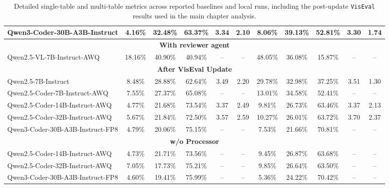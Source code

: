 \documentclass[a4paper,oneside,bibliography=totoc]{scrbook}
\begin{document}
\begin{table}[h!]
{\begin{tabular}{l|ccccc|ccccc}
Qwen3-Coder-30B-A3B-Instruct  & 4.16\% & 32.48\% & 63.37\% & 3.34 & 2.10 & 8.06\% & 39.13\% & 52.81\% & 3.30 & 1.74 \\

\midrule
\multicolumn{11}{c}{\textbf{With reviewer agent}} \\
\midrule
Qwen2.5-VL-7B-Instruct-AWQ  & 18.16\% & 40.90\% & 40.94\% & -- & -- & 48.05\% & 36.08\% & 15.87\% & -- & -- \\

\midrule
\multicolumn{11}{c}{\textbf{After VisEval Update}} \\
\midrule

Qwen2.5-7B-Instruct & 8.48\% & 28.88\% & 62.64\% & 3.49 & 2.20 & 29.78\% & 32.98\% & 37.25\% & 3.51 & 1.30 \\

Qwen2.5-Coder-7B-Instruct-AWQ & 7.55\% & 27.37\% & 65.08\% & -- & -- & 13.01\% & 34.58\% & 52.41\% & -- & -- \\

Qwen2.5-Coder-14B-Instruct-AWQ & 4.77\% & 21.68\% & 73.54\% & 3.37 & 2.49 & 9.81\% & 26.73\% & 63.46\% & 3.37 & 2.13 \\

Qwen2.5-Coder-32B-Instruct-AWQ & 5.67\% & 21.84\% & 72.50\% & 3.57 & 2.59 & 10.27\% & 26.01\% & 63.72\% & 3.70 & 2.37 \\

Qwen3-Coder-30B-A3B-Instruct-FP8 & 4.79\% & 20.06\% & 75.15\% & -- & -- & 7.53\% & 21.66\% & 70.81\% & -- & -- \\

\midrule
\multicolumn{11}{c}{\textbf{w/o Processor}} \\
\midrule

Qwen2.5-Coder-14B-Instruct-AWQ & 4.73\% & 21.71\% & 73.56\% & -- & -- & 9.45\% & 26.87\% & 63.68\% & -- & -- \\

Qwen2.5-Coder-32B-Instruct-AWQ & 7.05\% & 17.73\% & 75.21\% & -- & -- & 9.85\% & 26.64\% & 63.50\% & -- & -- \\

Qwen3-Coder-30B-A3B-Instruct-FP8 & 4.60\% & 19.41\% & 75.99\% & -- & -- & 5.36\% & 24.22\% & 70.42\% & -- & -- \\

\bottomrule
\end{tabular}
}
\caption{Detailed single-table and multi-table metrics across reported baselines and local runs, including the post-update \texttt{VisEval} results used in the main chapter analysis.}
\label{tab:appendix_detailed_results}
\end{table}
\end{document}
